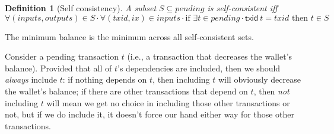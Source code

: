 \documentclass{article}
\newtheorem{definition}{Definition}
\begin{document}
\begin{definition}[Self consistency]
A subset $S \subseteq \mathit{pending}$ is \emph{self-consistent} iff
%
\begin{equation*}
\forall (\mathit{inputs}, \mathit{outputs}) \in S \cdot
\forall (\mathit{txid}, \mathit{ix}) \in \mathit{inputs} \cdot
\text{if } \exists t \in \mathit{pending} \cdot \mathsf{txid} ~ t = \mathit{txid}
\text{ then } t \in S
\end{equation*}
\end{definition}

The minimum balance is the minimum across all self-consistent sets.


Consider a pending transaction $t$ (i.e., a transaction that decreases
the wallet's balance). Provided that all of $t$'s dependencies are included,
then we should \emph{always} include $t$: if nothing depends on $t$, then
including $t$ will obviously decrease the wallet's balance; if there are
other transactions that depend on $t$, then \emph{not} including $t$ will
mean we get no choice in including those other transactions or not, but
if we do include it, it doesn't force our hand either way for those
other transactions.


\newcommand{\Y}[1]{#1}
\newcommand{\N}[1]{\overline{#1}}
\end{document}
